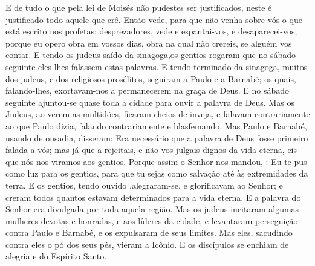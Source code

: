 {E de tudo o que pela lei de Moisés não pudestes ser justificados, neste é justificado todo aquele que crê.
Então vede, para que não venha sobre vós o que está escrito nos
{} profetas:
 desprezadores, vede e espantai-vos, e desaparecei-vos; porque eu opero obra em vossos dias, obra na qual não crereis, se alguém vos contar.
E tendo os judeus saído da sinagoga,os gentios rogaram
{} que no sábado seguinte eles lhes falassem estas palavras.
E tendo terminado
{} da sinagoga, muitos dos judeus, e dos religiosos prosélitos, seguiram a Paulo e a Barnabé; os quais, falando-lhes, exortavam-nos a permanecerem na graça de Deus.
E no sábado seguinte ajuntou-se quase toda a cidade para ouvir a palavra de Deus.
Mas os Judeus, ao verem as multidões, ficaram cheios de inveja, e falavam contrariamente ao que Paulo dizia, falando contrariamente e blasfemando.
Mas Paulo e Barnabé, usando de ousadia, disseram: Era necessário que a palavra de Deus fosse primeiro falada a vós; mas já que a rejeitais, e não vos julgais dignos da vida eterna, eis que nós nos viramos
{} aos gentios.
Porque assim o Senhor nos mandou,
{} : Eu te pus como luz para os gentios, para que tu sejas como salvação até às extremidades da terra.
E os gentios, tendo ouvido
{} ,alegraram-se, e glorificavam ao Senhor; e creram todos quantos estavam determinados para a vida eterna.
E a palavra do Senhor era divulgada por toda aquela região.
Mas os judeus incitaram algumas mulheres devotas e honradas, e aos líderes da cidade, e levantaram perseguição contra Paulo e Barnabé, e os expulsaram de seus limites.
Mas eles, sacudindo contra eles o pó dos seus pés, vieram a Icônio.
E os discípulos se enchiam de alegria e do Espírito Santo.

}
